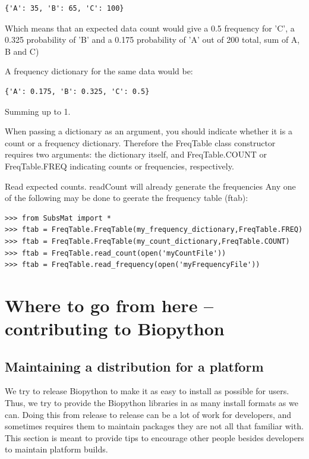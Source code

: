 \documentclass{report}
\begin{document}
\begin{enumerate}
\begin{verbatim}
{'A': 35, 'B': 65, 'C': 100}
\end{verbatim}

Which means that an expected data count would give a 0.5 frequency
for 'C', a 0.325 probability of 'B' and a 0.175 probability of 'A'
out of 200 total, sum of A, B and C)

 A frequency dictionary for the same data would be:

\begin{verbatim}
{'A': 0.175, 'B': 0.325, 'C': 0.5}
\end{verbatim}

Summing up to 1.

When passing a dictionary as an argument, you should indicate whether it is a count or a frequency dictionary. Therefore the FreqTable class constructor requires two arguments: the dictionary itself, and FreqTable.COUNT or FreqTable.FREQ indicating counts or frequencies, respectively.

Read expected counts. readCount will already generate the frequencies
Any one of the following may be done to geerate the frequency table (ftab):

\begin{verbatim}
>>> from SubsMat import *
>>> ftab = FreqTable.FreqTable(my_frequency_dictionary,FreqTable.FREQ)
>>> ftab = FreqTable.FreqTable(my_count_dictionary,FreqTable.COUNT)
>>> ftab = FreqTable.read_count(open('myCountFile'))
>>> ftab = FreqTable.read_frequency(open('myFrequencyFile'))
\end{verbatim}

\end{enumerate}

\chapter{Where to go from here -- contributing to Biopython}

\section{Maintaining a distribution for a platform}
\label{sec:maintain_dist}

We try to release Biopython to make it as easy to install as possible for users. Thus, we try to provide the Biopython libraries in as many install formats as we can. Doing this from release to release can be a lot of work for developers, and sometimes requires them to maintain packages they are not all that familiar with. This section is meant to provide tips to encourage other people besides developers to maintain platform builds.
\end{document}
